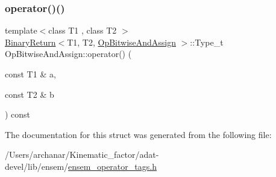 \subsubsection{\texorpdfstring{operator()()}{operator()()}\hspace{0.1cm}{\footnotesize\ttfamily [3/3]}}
{\footnotesize\ttfamily template$<$class T1 , class T2 $>$ \\
\mbox{\hyperlink{structBinaryReturn}{Binary\+Return}}$<$T1, T2, \mbox{\hyperlink{structOpBitwiseAndAssign}{Op\+Bitwise\+And\+Assign}} $>$\+::Type\+\_\+t Op\+Bitwise\+And\+Assign\+::operator() (\begin{DoxyParamCaption}\item[{const T1 \&}]{a,  }\item[{const T2 \&}]{b }\end{DoxyParamCaption}) const\hspace{0.3cm}{\ttfamily [inline]}}



The documentation for this struct was generated from the following file\+:\begin{DoxyCompactItemize}
\item 
/\+Users/archanar/\+Kinematic\+\_\+factor/adat-\/devel/lib/ensem/\mbox{\hyperlink{adat-devel_2lib_2ensem_2ensem__operator__tags_8h}{ensem\+\_\+operator\+\_\+tags.\+h}}\end{DoxyCompactItemize}
